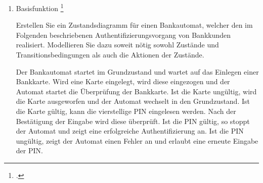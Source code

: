 \documentclass{bschlangaul-aufgabe}
\begin{document}

\begin{enumerate}


\item Basisfunktion
\footcite{examen:66116:2020:03}

Erstellen Sie ein Zustandsdiagramm für einen Bankautomat, welcher den im
Folgenden beschriebenen Authentifizierungsvorgang von Bankkunden
realisiert. Modellieren Sie dazu soweit nötig sowohl Zustände und
Transitionsbedingungen als auch die Aktionen der Zustände.

Der Bankautomat startet im Grundzustand und wartet auf das Einlegen
einer Bankkarte. Wird eine Karte eingelegt, wird diese eingezogen und
der Automat startet die Überprüfung der Bankkarte. Ist die Karte
ungültig, wird die Karte ausgeworfen und der Automat wechselt in den
Grundzustand. Ist die Karte gültig, kann die vierstellige PIN eingelesen
werden. Nach der Bestätigung der Eingabe wird diese überprüft. Ist die
PIN gültig, so stoppt der Automat und zeigt eine erfolgreiche
Authentifizierung an. Ist die PIN ungültig, zeigt der Automat einen
Fehler an und erlaubt eine erneute Eingabe der PIN.

\begin{bAntwort}
\end{bAntwort}
\end{enumerate}
\end{document}
